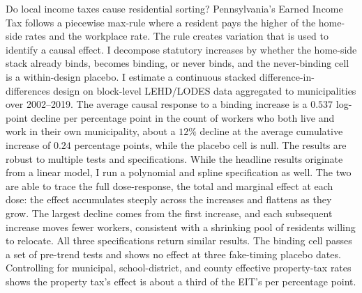 Do local income taxes cause residential sorting?
Pennsylvania's Earned Income Tax follows a piecewise max-rule where a
resident pays the higher of the home-side rates and the workplace
rate. The rule creates variation that is used to identify a causal effect. I
decompose statutory increases by whether the home-side stack already
binds, becomes binding, or never binds, and the never-binding cell is a within-design placebo. I estimate a continuous stacked
difference-in-differences design on block-level LEHD/LODES data
aggregated to municipalities over 2002--2019. The average causal response to a binding increase is a $0.537$
log-point decline per percentage point in the count of workers who
both live and work in their own municipality, about a $12\%$ decline
at the average cumulative increase of $0.24$ percentage points, while
the placebo cell is null. The results are robust to multiple tests and specifications. While the headline results originate from a linear model, I run a polynomial and spline specification as well. The two are able to trace the full
dose-response, the total and marginal effect at each dose: the effect
accumulates steeply across the increases and flattens as they
grow. The largest decline comes from the first increase, and each subsequent
increase moves fewer workers, consistent with a shrinking pool of
residents willing to relocate. All three specifications return similar results. The binding cell passes a set of pre-trend tests and shows no
effect at three fake-timing placebo dates. Controlling for municipal, school-district, and county effective
property-tax rates shows the property tax's effect is about a third of
the EIT's per percentage point.
